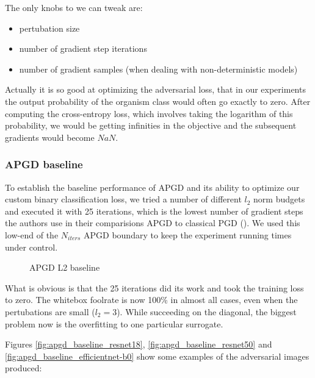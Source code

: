 The only knobs to we can tweak are:

\begin{itemize}
    \item pertubation size
    \item number of gradient step iterations
    \item number of gradient samples (when dealing with non-deterministic models)
\end{itemize}

Actually it is so good at optimizing the adversarial loss, that in our experiments the output probability of the organism class would often go exactly to zero. After computing the cross-entropy loss, which involves taking the logarithm of this probability, we would be getting infinities in the objective and the subsequent gradients would become $NaN$.

\subsubsection{APGD baseline}
To establish the baseline performance of APGD and its ability to optimize our custom binary classification loss, we tried a number of different $l_2$ norm budgets and executed it with 25 iterations, which is the lowest number of gradient steps the authors use in their comparisions APGD to classical PGD (\cite{croce2020reliable}). We used this low-end of the $N_{iters}$ APGD boundary to keep the experiment running times under control.

\begin{figure}[!htb]
\centering
\caption{APGD L2 baseline}
\label{fig:apgd_baseline}
\end{figure}



What is obvious is that the 25 iterations did its work and took the training loss to zero. The whitebox foolrate is now 100\% in almost all cases, even when the pertubations are small ($l_2 = 3$). While succeeding on the diagonal, the biggest problem now is the overfitting to one particular surrogate.


Figures \ref{fig:apgd_baseline_resnet18}, \ref{fig:apgd_baseline_resnet50} and \ref{fig:apgd_baseline_efficientnet-b0} show some examples of the adversarial images produced:

